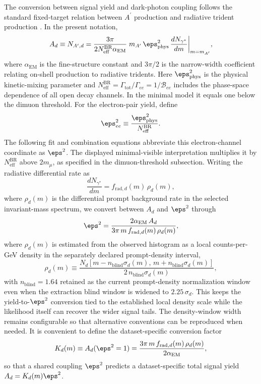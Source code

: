 The conversion between signal yield and dark-photon coupling follows the standard
fixed-target relation between $A^\prime$ production and radiative trident production
\cite{EssigEtAl2011,HPS2015DarkPhoton,HPS2016PromptLong}. In the present notation,
\begin{equation}
A_d\equiv N_{A^\prime,d}
= \frac{3\pi}{2N_{\mathrm{eff}}^{\mathrm{BR}}\alpha_{\mathrm{EM}}}
\; m_{A^\prime}\,\eps_{\rm phys}^2\,
\frac{dN_{\gamma^\ast}}{dm}\bigg|_{m=m_{A^\prime}},
\end{equation}
where $\alpha_{\mathrm{EM}}$ is the fine-structure constant and $3\pi/2$ is the
narrow-width coefficient relating on-shell production to radiative tridents.
Here $\eps_{\rm phys}^2$ is the physical kinetic-mixing parameter and
$N_{\mathrm{eff}}^{\mathrm{BR}}=\Gamma_{\mathrm{tot}}/\Gamma_{ee}
=1/\mathcal B_{ee}$ includes the phase-space dependence of all open decay
channels. In the minimal model it equals one below the dimuon threshold.
For the electron-pair yield, define
\begin{equation}
 \eps_{ee}^2\equiv\frac{\eps_{\rm phys}^2}{N_{\mathrm{eff}}^{\mathrm{BR}}}.
\end{equation}
The following fit and combination equations abbreviate this electron-channel
coordinate as $\eps^2$. The displayed minimal-visible interpretation multiplies
it by $N_{\mathrm{eff}}^{\mathrm{BR}}$ above $2m_\mu$, as specified in the
dimuon-threshold subsection. Writing the
radiative differential rate as
\begin{equation}
\frac{dN_{\gamma^\ast}}{dm}
= f_{\mathrm{rad},d}(m)\,\rho_d(m),
\end{equation}
where $\rho_d(m)$ is the differential prompt background rate in the selected
invariant-mass spectrum, we convert between $A_d$ and $\eps^2$ through
\begin{equation}
\eps^2 =
\frac{2\alpha_{\mathrm{EM}}\,A_d}
{3\pi\,m\,f_{\mathrm{rad},d}(m)\,\rho_d(m)},
\label{eq:eps2-conversion}
\end{equation}
where $\rho_d(m)$ is estimated from the observed histogram as a local counts-per-GeV
density in the separately declared prompt-density interval,
\begin{equation}
\rho_d(m)\equiv
\frac{N_d\!\left[m-n_{\mathrm{blind}}\sigma_d(m),\,m+n_{\mathrm{blind}}\sigma_d(m)\right]}
{2\,n_{\mathrm{blind}}\sigma_d(m)},
\end{equation}
with $n_{\mathrm{blind}}=1.64$ retained as the current prompt-density normalization
window even when the extraction blind window is widened to $2.25\,\sigma_d$. This keeps
the yield-to-$\eps^2$ conversion tied to the established local density scale while
the likelihood itself can recover the wider signal tails. The density-window width
remains configurable so that alternative conventions can be reproduced when needed.
It is convenient to define the
dataset-specific conversion factor
\begin{equation}
K_d(m) \equiv A_d(\eps^2 = 1)
= \frac{3\pi\,m\,f_{\mathrm{rad},d}(m)\,\rho_d(m)}{2\alpha_{\mathrm{EM}}},
\label{eq:Kd-conversion}
\end{equation}
so that a shared coupling $\eps^2$ predicts a dataset-specific total signal yield
$A_d = K_d(m)\eps^2$.


